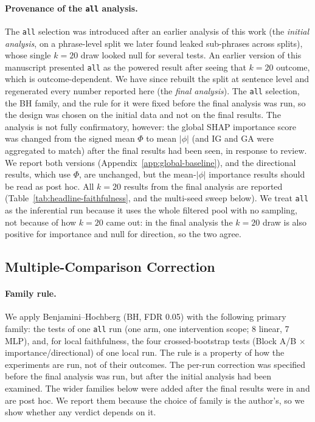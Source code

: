 \paragraph{Provenance of the \texttt{all} analysis.} The \texttt{all}
selection was introduced after an earlier analysis of this work (the
\emph{initial analysis}, on a phrase-level split we later found leaked
sub-phrases across splits), whose single $k=20$ draw looked null for several
tests. An earlier version of this manuscript presented \texttt{all} as the
powered result after seeing that $k=20$ outcome, which is outcome-dependent.
We have since rebuilt the split at sentence level and regenerated every
number reported here (the \emph{final analysis}). The \texttt{all}
selection, the BH family, and the rule for it were fixed before the final
analysis was run, so the design was chosen on the initial data and not on the
final results. The analysis is not fully confirmatory, however: the global SHAP
importance score was changed from the signed mean $\Phi$ to mean $|\phi|$ (and
IG and GA were aggregated to match) after the final results had been seen, in
response to review. We report both versions (Appendix~\ref{app:global-baseline}),
and the directional results, which use $\Phi$, are unchanged, but the
mean-$|\phi|$ importance results should be read as post hoc. All $k=20$ results from the final analysis are
reported (Table~\ref{tab:headline-faithfulness}, and the multi-seed sweep below). We treat
\texttt{all} as the inferential run because it uses the whole filtered pool
with no sampling, not because of how $k=20$ came out: in the final analysis the $k=20$
draw is also positive for importance and null for direction, so the two
agree.

\subsection{Multiple-Comparison Correction}
\label{app:bh}

\paragraph{Family rule.} We apply Benjamini--Hochberg (BH, FDR 0.05) with the
following primary family: the tests of one \texttt{all} run (one arm, one
intervention scope; 8 linear, 7 MLP), and, for local faithfulness, the four
crossed-bootstrap tests (Block A/B $\times$ importance/directional) of one
local run. The rule is a property of how the experiments are run, not of
their outcomes. The per-run correction was specified before the final
analysis was run, but after the initial analysis had been examined. The wider
families below were added after the final results were in and are post hoc. We report them because the choice of family is the
author's, so we show whether any verdict depends on it.

